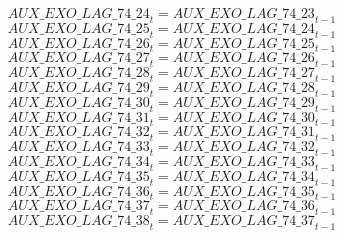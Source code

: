 \begin{dmath}
{AUX\_EXO\_LAG\_74\_24}_{t}={AUX\_EXO\_LAG\_74\_23}_{t-1}
\end{dmath}
\begin{dmath}
{AUX\_EXO\_LAG\_74\_25}_{t}={AUX\_EXO\_LAG\_74\_24}_{t-1}
\end{dmath}
\begin{dmath}
{AUX\_EXO\_LAG\_74\_26}_{t}={AUX\_EXO\_LAG\_74\_25}_{t-1}
\end{dmath}
\begin{dmath}
{AUX\_EXO\_LAG\_74\_27}_{t}={AUX\_EXO\_LAG\_74\_26}_{t-1}
\end{dmath}
\begin{dmath}
{AUX\_EXO\_LAG\_74\_28}_{t}={AUX\_EXO\_LAG\_74\_27}_{t-1}
\end{dmath}
\begin{dmath}
{AUX\_EXO\_LAG\_74\_29}_{t}={AUX\_EXO\_LAG\_74\_28}_{t-1}
\end{dmath}
\begin{dmath}
{AUX\_EXO\_LAG\_74\_30}_{t}={AUX\_EXO\_LAG\_74\_29}_{t-1}
\end{dmath}
\begin{dmath}
{AUX\_EXO\_LAG\_74\_31}_{t}={AUX\_EXO\_LAG\_74\_30}_{t-1}
\end{dmath}
\begin{dmath}
{AUX\_EXO\_LAG\_74\_32}_{t}={AUX\_EXO\_LAG\_74\_31}_{t-1}
\end{dmath}
\begin{dmath}
{AUX\_EXO\_LAG\_74\_33}_{t}={AUX\_EXO\_LAG\_74\_32}_{t-1}
\end{dmath}
\begin{dmath}
{AUX\_EXO\_LAG\_74\_34}_{t}={AUX\_EXO\_LAG\_74\_33}_{t-1}
\end{dmath}
\begin{dmath}
{AUX\_EXO\_LAG\_74\_35}_{t}={AUX\_EXO\_LAG\_74\_34}_{t-1}
\end{dmath}
\begin{dmath}
{AUX\_EXO\_LAG\_74\_36}_{t}={AUX\_EXO\_LAG\_74\_35}_{t-1}
\end{dmath}
\begin{dmath}
{AUX\_EXO\_LAG\_74\_37}_{t}={AUX\_EXO\_LAG\_74\_36}_{t-1}
\end{dmath}
\begin{dmath}
{AUX\_EXO\_LAG\_74\_38}_{t}={AUX\_EXO\_LAG\_74\_37}_{t-1}
\end{dmath}
